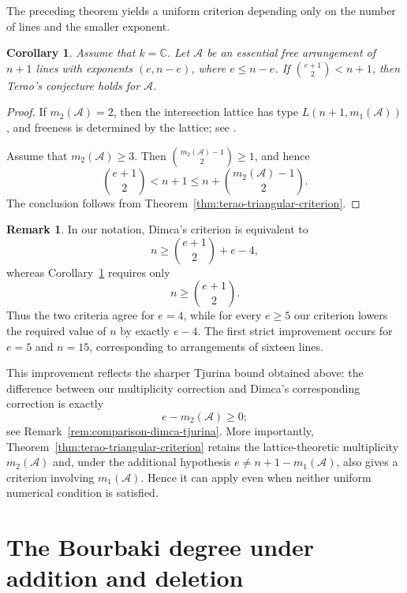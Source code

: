\documentclass[11pt]{amsart}   %
\newtheorem{Corollary}[Theorem]{Corollary}
\theoremstyle{definition}
\newtheorem{Remark}[Theorem]{Remark}
\def\NZQ{\mathbb}               %
\def\CC{{\NZQ C}}
\def\A{{\mathcal A}}
\begin{document}
The preceding theorem yields a uniform criterion depending only on the number of lines and the smaller exponent.

\begin{Corollary}
\label{cor:uniform-terao-triangular-criterion}
Assume that $k=\CC$. Let $\A$ be an essential free arrangement of $n+1$ lines with exponents $(e,n-e)$, where $e\leq n-e$. If $\binom{e+1}{2}<n+1$, then Terao's conjecture holds for $\A$.
\end{Corollary}

\begin{proof}
If $m_2(\A)=2$, then the intersection lattice has type $L(n+1,m_1(\A))$, and freeness is determined by the lattice; see \cite[Proposition~4.7]{Dimca-Ibadula-Macinic}.

Assume that $m_2(\A)\geq3$. Then $\binom{m_2(\A)-1}{2}\geq1$, and hence
\[
\binom{e+1}{2}
< n+1 \leq n+\binom{m_2(\A)-1}{2}.
\]
The conclusion follows from Theorem~\ref{thm:terao-triangular-criterion}.
\end{proof}

\begin{Remark}
\label{rem:comparison-dimca-terao}
In our notation, Dimca's criterion
\cite[Corollary~3.1]{Dimca-minimal-Tjurina} is equivalent to
\[
n\geq\binom{e+1}{2}+e-4,
\]
whereas Corollary~\ref{cor:uniform-terao-triangular-criterion}
requires only
\[
n\geq\binom{e+1}{2}.
\]
Thus the two criteria agree for $e=4$, while for every $e\geq5$
our criterion lowers the required value of $n$ by exactly $e-4$.
The first strict improvement occurs for $e=5$ and $n=15$,
corresponding to arrangements of sixteen lines.

This improvement reflects the sharper Tjurina bound obtained above:
the difference between our multiplicity correction and Dimca's
corresponding correction is exactly
\[
e-m_2(\A)\geq0;
\]
see Remark~\ref{rem:comparison-dimca-tjurina}. More importantly,
Theorem~\ref{thm:terao-triangular-criterion} retains the
lattice-theoretic multiplicity $m_2(\A)$ and, under the additional
hypothesis $e\neq n+1-m_1(\A)$, also gives a criterion involving
$m_1(\A)$. Hence it can apply even when neither uniform numerical
condition is satisfied.
\end{Remark}

\section{The Bourbaki degree under addition and deletion}
\label{sec:addition-deletion}
\end{document}
